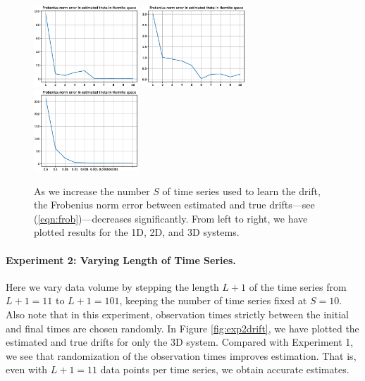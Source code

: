\documentclass{article}
\begin{document}
\begin{figure}[th]
\begin{center}
\includegraphics[height=1.2in]{../1dcode/varying_num_timeseries/plots/hermite.eps}
\includegraphics[height=1.2in]{../2dcode/varying_num_timeseries/plots/hermite.eps}
\includegraphics[height=1.2in]{../3ddampedduffing/varying_num_timeseries/plots/hermite.eps}
\end{center}
\caption{As we increase the number $S$ of time series used to learn the drift, the Frobenius norm error between estimated and true drifts---see (\ref{eqn:frob})---decreases significantly.  From left to right, we have plotted results for the 1D, 2D, and 3D systems.}
\label{fig:exp1hermite}
\end{figure}

\paragraph{Experiment 2: Varying Length of Time Series.} Here we vary data volume by stepping the length $L+1$ of the time series from $L+1 = 11$ to $L+1 = 101$, keeping the number of time series fixed at $S=10$.  Also note that in this experiment, observation times strictly between the initial and final times are chosen randomly.  In Figure \ref{fig:exp2drift}, we have plotted the estimated and true drifts for only the 3D system.  Compared with Experiment 1, we see that randomization of the observation times improves estimation.  That is, even with $L+1 = 11$ data points per time series, we obtain accurate estimates.
\end{document}
